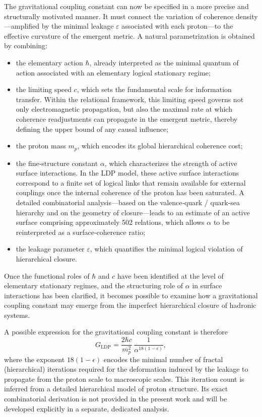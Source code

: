 \documentclass[11pt,a4paper]{article}
\begin{document}
The gravitational coupling constant can now be specified in a more precise and structurally motivated manner. It must connect the variation of coherence density—amplified by the minimal leakage \(\varepsilon\) associated with each proton—to the effective curvature of the emergent metric. A natural parametrization is obtained by combining:
\begin{itemize}[label=-]
  \item the elementary action \(\hbar\), already interpreted as the minimal quantum of action associated with an elementary logical stationary regime;
  \item the limiting speed \(c\), which sets the fundamental scale for information transfer. Within the relational framework, this limiting speed governs not only electromagnetic propagation, but also the maximal rate at which coherence readjustments can propagate in the emergent metric, thereby defining the upper bound of any causal influence;
  \item the proton mass \(m_p\), which encodes its global hierarchical coherence cost;
  \item the fine‑structure constant \(\alpha\), which characterizes the strength of active surface interactions. In the LDP model, these active surface interactions correspond to a finite set of logical links that remain available for external couplings once the internal coherence of the proton has been saturated. A detailed combinatorial analysis—based on the valence‑quark / quark‑sea hierarchy and on the geometry of closure—leads to an estimate of an active surface comprising approximately 502 relations, which allows \(\alpha\) to be reinterpreted as a surface‑coherence ratio;
  \item the leakage parameter \(\varepsilon\), which quantifies the minimal logical violation of hierarchical closure.
\end{itemize}

Once the functional roles of \(\hbar\) and \(c\) have been identified at the level of elementary stationary regimes, and the structuring role of \(\alpha\) in surface interactions has been clarified, it becomes possible to examine how a gravitational coupling constant may emerge from the imperfect hierarchical closure of hadronic systems.

A possible expression for the gravitational coupling constant is therefore
\[
G_{\mathrm{LDP}}
= \frac{2 \hbar c}{m_p^{2}}\,
  \frac{1}{\alpha^{18(1-\epsilon)}},
\]
where the exponent \(18(1-\epsilon)\) encodes the minimal number of fractal (hierarchical) iterations required for the deformation induced by the leakage to propagate from the proton scale to macroscopic scales. This iteration count is inferred from a detailed hierarchical model of proton structure. Its exact combinatorial derivation is not provided in the present work and will be developed explicitly in a separate, dedicated analysis.
\end{document}
